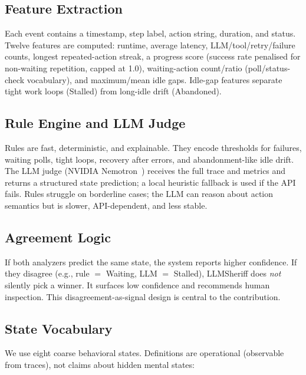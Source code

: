 \documentclass[conference]{IEEEtran}
\begin{document}
\subsection{Feature Extraction}

Each event contains a timestamp, step label, action string, duration, and status. Twelve
features are computed: runtime, average latency, LLM/tool/retry/failure counts, longest
repeated-action streak, a progress score (success rate penalised for non-waiting
repetition, capped at 1.0), waiting-action count/ratio (poll/status-check vocabulary),
and maximum/mean idle gaps. Idle-gap features separate tight work loops (Stalled) from
long-idle drift (Abandoned).

\subsection{Rule Engine and LLM Judge}

Rules are fast, deterministic, and explainable. They encode thresholds for failures,
waiting polls, tight loops, recovery after errors, and abandonment-like idle drift. The
LLM judge (NVIDIA Nemotron~\cite{nimotron}) receives the full trace and metrics and
returns a structured state prediction; a local heuristic fallback is used if the API
fails. Rules struggle on borderline cases; the LLM can reason about action semantics but
is slower, API-dependent, and less stable.

\subsection{Agreement Logic}

If both analyzers predict the same state, the system reports higher confidence. If they
disagree (e.g., rule $=$ Waiting, LLM $=$ Stalled), LLMSheriff does \emph{not} silently
pick a winner. It surfaces low confidence and recommends human inspection. This
disagreement-as-signal design is central to the contribution.

\subsection{State Vocabulary}

We use eight coarse behavioral states. Definitions are operational (observable from
traces), not claims about hidden mental states:
\end{document}
